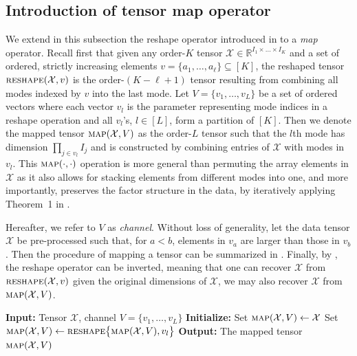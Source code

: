 \documentclass[aos]{imsart}
\theoremstyle{plain}
\theoremstyle{definition}
\def\map{\textnormal{\textsc{map}}}
\def\reshape{\textnormal{\textsc{reshape}}}
\def\R{\mathbb{R}}
\def\cX{\mathcal{X}}
\begin{document}
\begin{appendix}

\section{Introduction of tensor map operator}
\label{sec: intro_map}

We extend in this subsection the reshape operator introduced in \cite{CenLam2025_KronProd} to a \textit{map} operator. Recall first that given any order-$K$ tensor $\cX\in \R^{I_1\times \dots \times I_K}$ and a set of ordered, strictly increasing elements $v=\{a_1,\dots, a_\ell\} \subseteq[K]$, the reshaped tensor $\reshape(\cX,v)$ is the order-$(K-\ell+1)$ tensor resulting from combining all modes indexed by $v$ into the last mode. Let $V=\{v_1,\dots, v_L\}$ be a set of ordered vectors where each vector $v_l$ is the parameter representing mode indices in a reshape operation and all $v_l$'s, $l\in[L]$, form a partition of $[K]$. Then we denote the mapped tensor $\map(\cX, V)$ as the order-$L$ tensor such that the $l$th mode has dimension $\prod_{j\in v_l} I_j$ and is constructed by combining entries of $\cX$ with modes in $v_l$. This $\map(\cdot,\cdot)$ operation is more general than permuting the array elements in $\cX$ as it also allows for stacking elements from different modes into one, and more importantly, preserves the factor structure in the data, by iteratively applying Theorem~1 in \cite{CenLam2025_KronProd}.

Hereafter, we refer to $V$ as \textit{channel}. Without loss of generality, let the data tensor $\cX$ be pre-processed such that, for $a<b$, elements in $v_a$ are larger than those in $v_b$. Then the procedure of mapping a tensor can be summarized in . Finally, by \cite{CenLam2025_KronProd}, the reshape operator can be inverted, meaning that one can recover $\cX$ from $\reshape(\cX, v)$ given the original dimensions of $\cX$, we may also recover $\cX$ from $\map(\cX, V)$.


\begin{algorithm}
\caption{Tensor map}\label{alg: map}
\begin{algorithmic}[1]
\State \textbf{Input:} Tensor $\cX$, channel $V=\{v_1,\dots, v_L\}$
\State \textbf{Initialize:} Set $\map(\cX, V) \gets \cX$
\State Set $\map(\cX, V) \gets \reshape\big\{ \map(\cX, V), v_l \big\}$
\EndFor
\State \textbf{Output:} The mapped tensor $\map(\cX, V)$
\end{algorithmic}
\end{algorithm}




\end{appendix}
\end{document}
